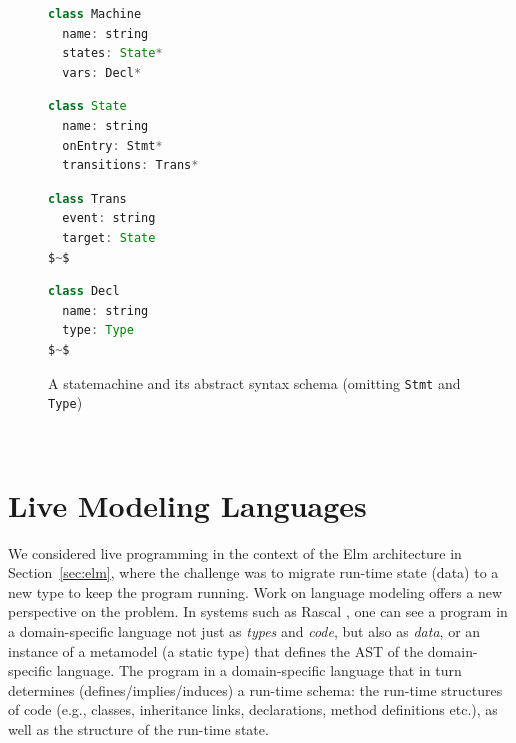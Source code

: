 \documentclass[english,submission]{programming}
\begin{document}
\begin{figure}[t]
\begin{adjustwidth}{-1.5em}{-1.5em}
\begin{minipage}[t]{0.26\textwidth}
\begin{lstlisting}[language=java,morekeywords={on},mathescape,numbers=none]
class Machine
  name: string
  states: State*
  vars: Decl*
\end{lstlisting}
\end{minipage}
\begin{minipage}[t]{0.28\textwidth}
\begin{lstlisting}[language=java,morekeywords={on},mathescape,numbers=none]
class State
  name: string
  onEntry: Stmt*
  transitions: Trans*
\end{lstlisting}
\end{minipage}
\begin{minipage}[t]{0.24\textwidth}
\begin{lstlisting}[language=java,morekeywords={on},mathescape,numbers=none]
class Trans
  event: string
  target: State
$~$
\end{lstlisting}
\end{minipage}
\begin{minipage}[t]{0.24\textwidth}
\begin{lstlisting}[language=java,morekeywords={on},mathescape,numbers=none]
class Decl
  name: string
  type: Type
$~$
\end{lstlisting}
\end{minipage}
\end{adjustwidth}
\vspace{-1em}
\caption{A statemachine and its abstract syntax schema (omitting \lstinline{Stmt} and \lstinline{Type})}
\label{lst:machinedef}
\vspace{0.5em}
\end{figure}

~

\section{Live Modeling Languages}
\label{sec:livemodeling}

We considered live programming in the context of the Elm architecture in Section~\ref{sec:elm},
where the challenge was to migrate run-time state (data) to a new type to keep the program running.
Work on language modeling offers a new perspective on the problem. In systems such as Rascal
\cite{klint2011easy}, one can see a program in a domain-specific language not just as \emph{types}
and \emph{code}, but also as \emph{data}, or an instance of a metamodel (a static type) that
defines the AST of the domain-specific language. The program in a domain-specific language
that in turn determines (defines/implies/induces) a run-time schema: the run-time structures
of code (e.g., classes, inheritance links, declarations, method definitions etc.), as well as
the structure of the run-time state.
\end{document}
